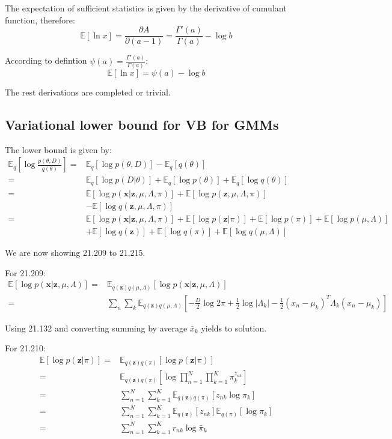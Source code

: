 \documentclass[UTF8]{ctexart}
\begin{document}
The expectation of sufficient statistics is given by the derivative of cumulant function, therefore:
$$\mathbb{E}[\ln x] = \frac{\partial A}{\partial (a-1)} = \frac{\Gamma'(a)}{\Gamma(a)}-\log b$$

According to defintion $\psi(a)=\frac{\Gamma'(a)}{\Gamma(a)}$:
$$\mathbb{E}[\ln x] = \psi(a)-\log b$$

The rest derivations are completed or trivial.

\subsection{Variational lower bound for VB for GMMs}
The lower bound is given by:
\begin{align}
\mathbb{E}_{q}[\log \frac{p(\theta,D)}{q(\theta)}] =& \mathbb{E}_{q}[\log p(\theta,D)] -\mathbb{E}_{q}[q(\theta)]\nonumber \\
=&\mathbb{E}_{q}[\log p(D|\theta)]+\mathbb{E}_{q}[\log p(\theta)]+\mathbb{E}_{q}[\log q(\theta)] \nonumber \\
=&\mathbb{E}[\log p(\textbf{x}|\textbf{z},\mu,\Lambda,\pi)] + \mathbb{E}[\log p(\textbf{z},\mu,\Lambda,\pi)]\nonumber \\
\ &-\mathbb{E}[\log q(\textbf{z},\mu,\Lambda,\pi)]\nonumber \\
=&\mathbb{E}[\log p(\textbf{x}|\textbf{z},\mu,\Lambda,\pi)] + \mathbb{E}[\log p(\textbf{z}|\pi)] + \mathbb{E}[\log p(\pi)] + \mathbb{E}[\log p(\mu, \Lambda)] \nonumber \\
\ &+ \mathbb{E}[\log q(\textbf{z})] + \mathbb{E}[\log q(\pi)] + \mathbb{E}[\log q(\mu,\Lambda)]\nonumber
\end{align}

We are now showing 21.209 to 21.215.

For 21.209:
\begin{align}
\mathbb{E}[\log p(\textbf{x}|\textbf{z},\mu,\Lambda)]=& \mathbb{E}_{q(\textbf{z})q(\mu,\Lambda)}[\log p(\textbf{x}|\textbf{z},\mu,\Lambda)] \nonumber \\
=& \sum_{n}\sum_{k}\mathbb{E}_{q(\textbf{z})q(\mu,\Lambda)}[-\frac{D}{2}\log 2\pi + \frac{1}{2}\log |\Lambda_{k}|-\frac{1}{2}(x_{n}-\mu_{k})^{T}\Lambda_{k}(x_{n}-\mu_{k})]\nonumber
\end{align}

Using 21.132 and converting summing by average $\bar{x}_{k}$ yields to solution.

For 21.210:
\begin{align}
\mathbb{E}[\log p(\textbf{z}|\pi)]=&\mathbb{E}_{q(\textbf{z})q(\pi)}[\log p(\textbf{z}|\pi)]\nonumber \\
=&\mathbb{E}_{q(\textbf{z})q(\pi)}[\log \prod_{n=1}^{N}\prod_{k=1}^{K}\pi_{k}^{z_{nk}}] \nonumber \\
=&\sum_{n=1}^{N}\sum_{k=1}^{K}\mathbb{E}_{q(\textbf{z})q(\pi)}[z_{nk}\log \pi_{k}]\nonumber \\
=&\sum_{n=1}^{N}\sum_{k=1}^{K}\mathbb{E}_{q(\textbf{z})}[z_{nk}]\mathbb{E}_{q(\pi)}[\log \pi_{k}]\nonumber \\
=&\sum_{n=1}^{N}\sum_{k=1}^{K}r_{nk}\log \bar{\pi}_{k}\nonumber
\end{align}
\end{document}
